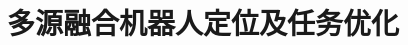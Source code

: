 \title{多源融合机器人定位及任务优化}

\baominghao{}
\schoolname{}
\membera{}
\memberb{}
\memberc{}
\supervisor{}
\dayinput{}
